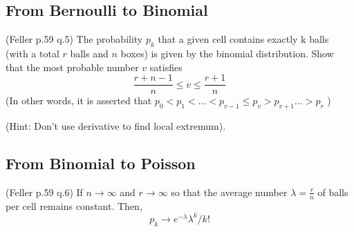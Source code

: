 \subsection{From Bernoulli to Binomial}
\begin{exercise}
    (Feller p.59 q.5) The probability \(p_{k}\) that a given  cell contains exactly k balls (with a total \(r\) balls and \(n\) boxes) is given by the binomial distribution. 
    Show that the most probable number \(v\) satisfies 
    \[
        \frac{r+n-1}{n} \leq  v \leq \frac{r+1}{n}
    \]
    (In other words, it is asserted that \(p_0 < p_1 < \dots < p_{v-1} \leq p_{v} >  p_{v+1} \dots > p_r \) )
\end{exercise}
(Hint: Don't use derivative to find local extremum).

\subsection{From Binomial to Poisson}
\begin{exercise}
 (Feller p.59 q.6) If \(n \to \infty \) and \(r\to \infty \) so that the average number \(\lambda  = \frac{r}{n}\) of balls per cell remains constant. Then,
\[
    p_{k} \to e^{-\lambda }\lambda^k / k!
\]    
\end{exercise}



